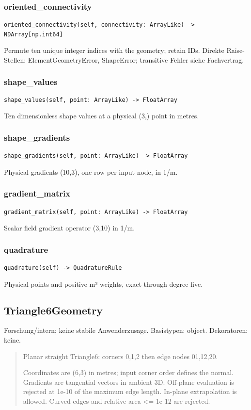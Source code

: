 \subsubsection*{oriented\_connectivity}
\begin{lstlisting}
oriented_connectivity(self, connectivity: ArrayLike) -> NDArray[np.int64]
\end{lstlisting}
Permute ten unique integer indices with the geometry; retain IDs.
Direkte Raise-Stellen: ElementGeometryError, ShapeError; transitive Fehler siehe Fachvertrag.
\subsubsection*{shape\_values}
\begin{lstlisting}
shape_values(self, point: ArrayLike) -> FloatArray
\end{lstlisting}
Ten dimensionless shape values at a physical (3,) point in metres.
\subsubsection*{shape\_gradients}
\begin{lstlisting}
shape_gradients(self, point: ArrayLike) -> FloatArray
\end{lstlisting}
Physical gradients (10,3), one row per input node, in 1/m.
\subsubsection*{gradient\_matrix}
\begin{lstlisting}
gradient_matrix(self, point: ArrayLike) -> FloatArray
\end{lstlisting}
Scalar field gradient operator (3,10) in 1/m.
\subsubsection*{quadrature}
\begin{lstlisting}
quadrature(self) -> QuadratureRule
\end{lstlisting}
Physical points and positive m³ weights, exact through degree five.
\subsection{Triangle6Geometry}
Forschung/intern; keine stabile Anwenderzusage.
Basistypen: object. Dekoratoren: keine.
\begin{quote}
Planar straight Triangle6: corners 0,1,2 then edge nodes 01,12,20.\par Coordinates are (6,3) in metres; input corner order defines the normal. Gradients are tangential vectors in ambient 3D. Off-plane evaluation is rejected at 1e-10 of the maximum edge length. In-plane extrapolation is allowed. Curved edges and relative area <= 1e-12 are rejected.
\end{quote}
